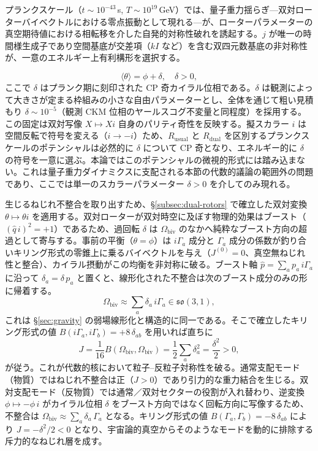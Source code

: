 \documentclass[a4paper]{article}
\begin{document}
プランクスケール（$t \sim 10^{-43}$\,s, $T \sim 10^{19}$\,GeV）では、量子重力揺らぎ---双対ローターバイベクトルにおける零点振動として現れる---が、ローターパラメーターの真空期待値における相転移を介した自発的対称性破れを誘起する。$j$ が唯一の時間様生成子であり空間基底が交差項（$kI$ など）を含む双四元数基底の非対称性が、一意のエネルギー上有利構形を選択する。

\[
\langle \theta \rangle = \phi + \delta, \quad \delta > 0,
\]
ここで $\delta$ はプランク期に刻印された CP 奇カイラル位相である。$\delta$ は観測によって大きさが定まる枠組みの小さな自由パラメーターとし、全体を通じて粗い見積もり $\delta \sim 10^{-5}$（観測 CKM 位相のヤールスコグ不変量と同程度）を採用する。この固定は双対写像 $X \mapsto X i$ 自身のパリティ奇性を反映する。擬スカラー $i$ は空間反転で符号を変える（$i \to -i$）ため、$R_\text{usual}$ と $R_\text{dual}$ を区別するプランクスケールのポテンシャルは必然的に $\delta$ について CP 奇となり、エネルギー的に $\delta$ の符号を一意に選ぶ。本論ではこのポテンシャルの微視的形式には踏み込まない。これは量子重力ダイナミクスに支配される本節の代数的議論の範囲外の問題であり、ここでは単一のスカラーパラメーター $\delta > 0$ を介してのみ現れる。

生じるねじれ不整合を取り出すため、\S\ref{subsec:dual-rotors} で確立した双対変換 $\theta \mapsto \theta i$ を適用する。双対ローターが双対時空に及ぼす物理的効果はブースト（$(\hat q\, i)^2 = +1$）であるため、過回転 $\delta$ は $\Omega_\text{biv}$ のなかへ純粋なブースト方向の超過として寄与する。事前の平衡（$\theta = \phi$）は $i\Gamma_a$ 成分と $\Gamma_a$ 成分の係数が釣り合いキリング形式の零錐上に乗るバイベクトルを与え（$J^{(0)} = 0$、真空無ねじれ性と整合）、カイラル摂動がこの均衡を非対称に破る。ブースト軸 $\hat p = \sum_a p_a\, i\Gamma_a$ に沿って $\delta_a = \delta\, p_a$ と置くと、線形化された不整合は次のブースト成分のみの形に帰着する。
\[
\Omega_\text{biv} \approx \sum_a \delta_a\, i\Gamma_a \in \mathfrak{so}(3,1),
\]
これは \S\ref{sec:gravity} の弱場線形化と構造的に同一である。そこで確立したキリング形式の値 $B(i\Gamma_a, i\Gamma_b) = +8\,\delta_{ab}$ を用いれば直ちに
\[
J = \frac{1}{16} B(\Omega_\text{biv}, \Omega_\text{biv}) = \frac{1}{2}\sum_a \delta_a^2 = \frac{\delta^2}{2} > 0,
\]
が従う。これが代数的核において粒子--反粒子対称性を破る。通常支配モード（物質）ではねじれ不整合は正（$J > 0$）であり引力的な重力結合を生じる。双対支配モード（反物質）では通常／双対セクターの役割が入れ替わり、逆変換 $\phi \mapsto -\phi\, i$ がカイラル位相 $\delta$ をブースト方向ではなく回転方向に写像するため、不整合は $\Omega_\text{biv} \approx \sum_a \delta_a\, \Gamma_a$ となる。キリング形式の値 $B(\Gamma_a, \Gamma_b) = -8\,\delta_{ab}$ により $J = -\delta^2/2 < 0$ となり、宇宙論的真空からそのようなモードを動的に排除する斥力的なねじれ層を成す。
\end{document}
